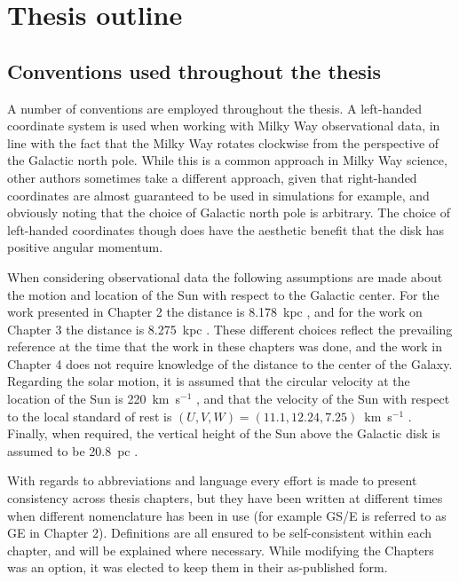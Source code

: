 \section{Thesis outline}



\subsection{Conventions used throughout the thesis}

A number of conventions are employed throughout the thesis. A left-handed coordinate system is used when working with Milky Way observational data, in line with the fact that the Milky Way rotates clockwise from the perspective of the Galactic north pole. While this is a common approach in Milky Way science, other authors sometimes take a different approach, given that right-handed coordinates are almost guaranteed to be used in simulations for example, and obviously noting that the choice of Galactic north pole is arbitrary. The choice of left-handed coordinates though does have the aesthetic benefit that the disk has positive angular momentum.

When considering observational data the following assumptions are made about the motion and location of the Sun with respect to the Galactic center. For the work presented in Chapter 2 the distance is 8.178~kpc \parencite{gravity19}, and for the work on Chapter 3 the distance is 8.275~kpc \parencite{gravity21}. These different choices reflect the prevailing reference at the time that the work in these chapters was done, and the work in Chapter 4 does not require knowledge of the distance to the center of the Galaxy. Regarding the solar motion, it is assumed that the circular velocity at the location of the Sun is 220~km~s$^{-1}$ \parencite[e.g.][]{bovy12a}, and that the velocity of the Sun with respect to the local standard of rest is $(U,V,W) = (11.1,12.24,7.25)$~km~s$^{-1}$ \parencite{schoenrich10}. Finally, when required, the vertical height of the Sun above the Galactic disk is assumed to be 20.8~pc \parencite{bennett19}.

With regards to abbreviations and language every effort is made to present consistency across thesis chapters, but they have been written at different times when different nomenclature has been in use (for example GS/E is referred to as GE in Chapter 2). Definitions are all ensured to be self-consistent within each chapter, and will be explained where necessary. While modifying the Chapters was an option, it was elected to keep them in their as-published form.

